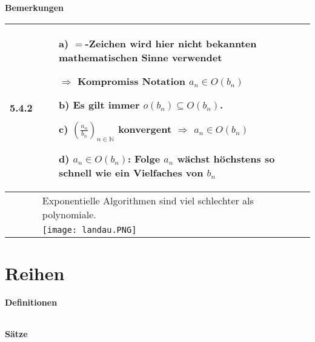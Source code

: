 \noindent
\textbf{Bemerkungen}
\begin{table}[H]
\begin{tabularx}{\textwidth}{X m{16cm}}
    \toprule

    5.4.2 & \begin{itemize}
                \item[a)] $=$-Zeichen wird hier nicht bekannten mathematischen Sinne verwendet
                \item[] $\Rightarrow$ Kompromiss Notation $a_n \in O(b_n)$ 
                \item[b)] Es gilt immer $o(b_n) \subseteq O(b_n)$. 
                \item[c)] $(\frac{a_n}{b_n})_{n \in \mathbb{N}}$ konvergent $\Rightarrow$ $a_n \in O(b_n)$
                \item[d)] $a_n \in O(b_n)$: Folge $a_n$ wächst höchstens so schnell wie ein Vielfaches von $b_n$  
            \end{itemize} \\
    \midrule
          & Exponentielle Algorithmen sind viel schlechter als polynomiale. \\
    \midrule
          & \texttt{[image: landau.PNG]} \\

    \bottomrule
\end{tabularx}
\end{table}

\section{Reihen}
\noindent
\textbf{Definitionen}
\begin{table}[H]  
\begin{tabularx}{\textwidth}{X m{16cm}}
    \toprule
    
    & \\

    \bottomrule
    
\end{tabularx}
\end{table}

\noindent 
\textbf{Sätze}
\begin{table}[H]
\begin{tabularx}{\textwidth}{X m{16cm}}
    \toprule

    & \\

    \bottomrule
\end{tabularx}
\end{table}

